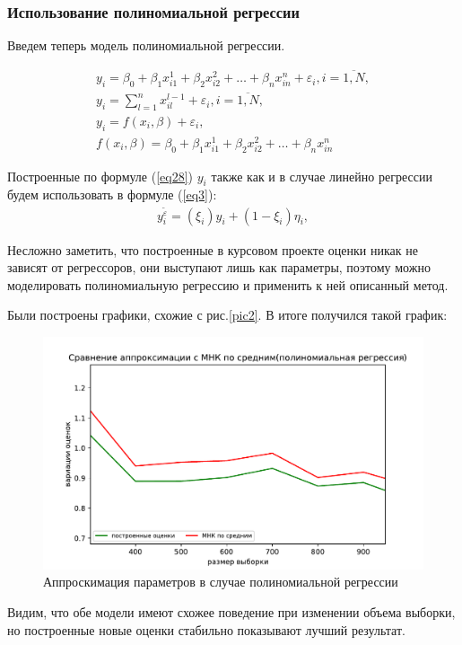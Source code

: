 \newpage

\subsubsection{Использование полиномиальной регрессии}
Введем теперь модель полиномиальной регрессии.

\begin{equation}
    \begin{array}{c}
        \label{eq28}y_i=\beta_0+\beta_1 x_{i1}^1+\beta_2 x_{i2}^2+\dots+\beta_n x_{in}^n+\varepsilon_i, i=\overline{1,N},\\
        y_i = \sum\limits_{l=1}^{n} x_{il}^{l-1} + \varepsilon_i, i=\overline{1,N},\\
        y_i= f(x_i,\beta)+\varepsilon_i,\\
        f(x_i,\beta)=\beta_0+\beta_1 x_{i1}^1+\beta_2 x_{i2}^2+\dots+\beta_n x_{in}^n
    \end{array}
\end{equation}

Построенные по формуле (\ref{eq28}) $y_i$ также как и в случае линейно регрессии будем использовать в формуле (\ref{eq3}):
\begin{eqnarray}
    y_i^{\widetilde{\varepsilon}}=(\xi_i)y_i+ (1-\xi_i)\eta_i,
\end{eqnarray}

Несложно заметить, что построенные в курсовом проекте оценки никак не зависят от регрессоров, они выступают лишь как параметры, поэтому можно моделировать полиномиальную регрессию и применить к ней описанный метод.

Были построены графики, схожие с рис.\ref{pic2}. В итоге получился такой график:
\begin{figure}[h!]
    \centering
    \includegraphics[width=150mm]{../images/polynomial.pdf}
    \caption{Аппроскимация параметров в случае полиномиальной регрессии\label{overflow}}
    \label{pic1}
\end{figure}

Видим, что обе модели имеют схожее поведение при изменении объема выборки, но построенные новые оценки стабильно показывают лучший результат.